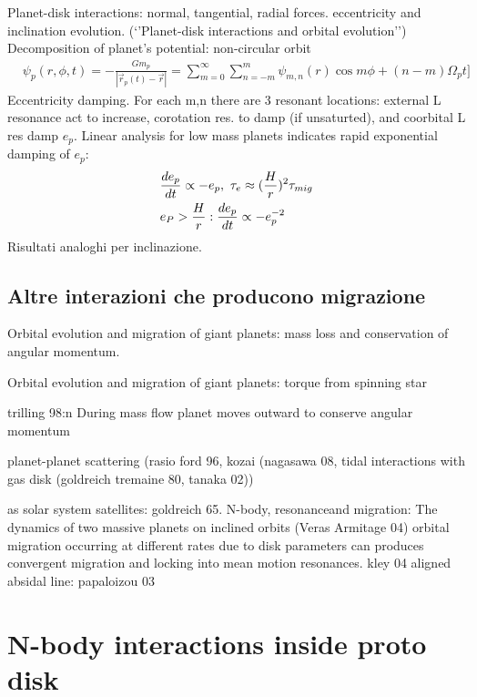 \begin{workout}
Planet-disk interactions: normal, tangential, radial forces. eccentricity and inclination evolution. (‘’Planet-disk interactions and orbital evolution’’)
Decomposition of planet’s potential: non-circular orbit
\begin{align*}
&\psi_p(r,\phi,t)=-\frac{Gm_p}{|\vec{r}_p(t)-\vec{r}|}=\sum_{m=0}^{\infty}\sum_{n=-m}^m\psi_{m,n}(r)\cos{m\phi+(n-m)\Omega_pt]}
\end{align*}
Eccentricity damping.
For each m,n there are 3 resonant locations: external L resonance act to increase, corotation res. to damp (if unsaturted), and coorbital L res damp $e_p$. Linear analysis for low mass planets indicates rapid exponential damping of $e_p$:
\begin{align*}
&\TDy{t}{e_p}\propto-e_p,\ \tau_e\approx(\frac{H}{r})^2\tau_{mig}\\
&e_P>\frac{H}{r}: \TDy{t}{e_p}\propto-e_p\expy{-2}
\end{align*}
Risultati analoghi per inclinazione.	
\end{workout}

\section{Altre interazioni che producono migrazione}


\begin{workout}
Orbital evolution and migration of giant planets: mass loss and conservation of angular momentum.
\end{workout}

\begin{workout}
Orbital evolution and migration of giant planets: torque from spinning star
\end{workout}

\begin{workout}
trilling 98:n During mass flow planet moves outward to conserve angular momentum
\end{workout}

\begin{workout}
planet-planet scattering (rasio ford 96, kozai (nagasawa 08, tidal interactions with gas disk (goldreich tremaine 80, tanaka 02))
\end{workout}

\begin{workout}
as solar system satellites: goldreich 65.
N-body, resonanceand migration: The dynamics of two massive planets on inclined orbits (Veras Armitage 04)
orbital migration occurring at different rates due to disk parameters can produces convergent migration and locking into mean motion resonances.
kley 04
aligned absidal line: papaloizou 03
\end{workout}

{\let\clearpage\relax\let\cleardoublepage\relax
\chapter{N-body interactions inside proto disk}
}